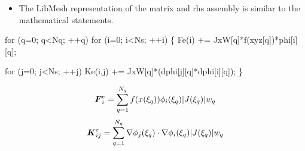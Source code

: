 \begin{frame}[fragile,t]  
	  \begin{itemize}    
	  \item{ The LibMesh representation of the matrix and
	    rhs assembly is similar to the mathematical statements.
	  }
	  \end{itemize}
\small
\begin{semiverbatim}
for (q=0; q<Nq; ++q) 
  for (i=0; i<Ns; ++i) \{
    \alert<2>{Fe(i)   += JxW[q]*f(xyz[q])*phi[i][q];}
    
    for (j=0; j<Ns; ++j)
      \alert<3>{Ke(i,j) += JxW[q]*(dphi[j][q]*dphi[i][q]);}
  \}
\end{semiverbatim}
{
  \begin{equation}
    \nonumber
    {\boldsymbol{F}}^e_{i} = 
    \sum_{q=1}^{N_q}
    f(x(\xi_q))
    \phi_i(\xi_q)
    |J(\xi_q)| w_q
  \end{equation}
}
{
  \begin{equation}
  \nonumber
  {\boldsymbol{K}}^e_{ij} =
  \sum_{q=1}^{N_q}
    \nabla \phi_j(\xi_q) \cdot
    \nabla \phi_i(\xi_q)
    |J(\xi_q)| w_q
  \end{equation}
}
\end{frame}
